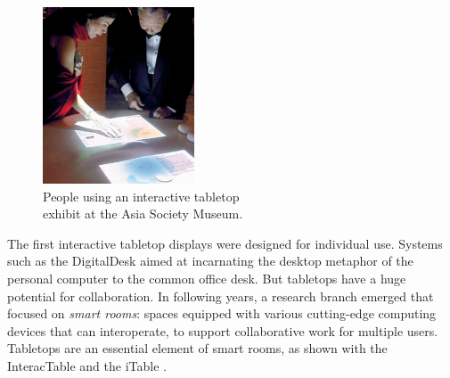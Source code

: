 \begin{figure}[htb]
  \centering
    \includegraphics[width=0.4\textwidth]{images/visitors}
  \caption{People using an interactive tabletop\\exhibit at the Asia Society Museum.}
  \label{visitors}
\end{figure}

The first interactive tabletop displays were designed for individual use.
Systems such as the DigitalDesk \citep{Wellner:1993:digitaldesk} aimed at incarnating the desktop metaphor of the personal computer to the common office desk.
But tabletops have a huge potential for collaboration.
In following years, a research branch emerged that focused on \emph{smart rooms}: spaces equipped with various cutting-edge computing devices that can interoperate, to support collaborative work for multiple users.
Tabletops are an essential element of smart rooms, as shown with the InteracTable \citep{Streitz:1999:iland} and the iTable \citep{Johanson:2002:iroom}.

